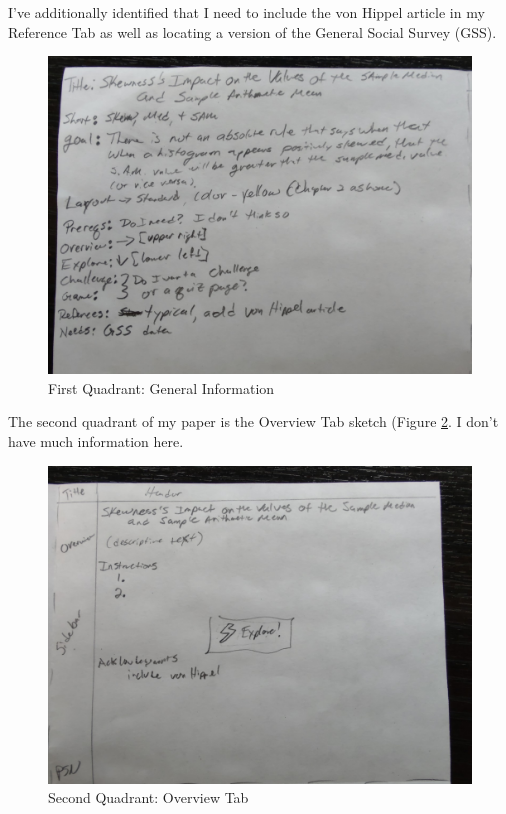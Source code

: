 \documentclass[
]{book}
\begin{document}
I've additionally identified that I need to include the von Hippel article in my Reference Tab as well as locating a version of the General Social Survey (GSS).

\begin{figure}

{\centering \includegraphics[width=22.22in]{images/planSketch2-Info} 

}

\caption{First Quadrant: General Information}\label{fig:planSketchInfo}
\end{figure}

The second quadrant of my paper is the Overview Tab sketch (Figure \ref{fig:planSketchOverview}. I don't have much information here.

\begin{figure}

{\centering \includegraphics[width=22.22in]{images/planSketch3-Overview} 

}

\caption{Second Quadrant: Overview Tab}\label{fig:planSketchOverview}
\end{figure}
\end{document}
